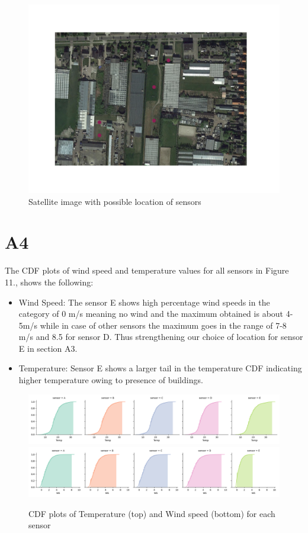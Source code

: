 \documentclass[a4paper]{article}
\begin{document}
\begin{figure}[H]
\includegraphics[width=19cm]{images/SensorsSketch.png}
\centering
\caption{ Satellite image with possible location of sensors}
\end{figure}


\newpage
\section{A4}
The CDF plots of wind speed and temperature values for all sensors in Figure 11., shows the following:
\begin{itemize}
  \item Wind Speed: The sensor E shows high percentage wind speeds in the category of 0 m/s meaning no wind and the maximum obtained is about 4-5m/s while in case of other sensors the maximum goes in the range of 7-8 m/s and 8.5 for sensor D. Thus strengthening our choice of location for sensor E in section A3.
  \item Temperature: Sensor E shows a larger tail in the temperature CDF indicating higher temperature owing to presence of buildings.
\end{itemize}

\begin{figure}[H]
\includegraphics[width=17cm]{images/a4_1.png}
\centering
\includegraphics[width=17cm]{images/a4_2.png}
\centering
\caption{ CDF plots of Temperature (top) and Wind speed (bottom) for each sensor}
\end{figure}
\end{document}
